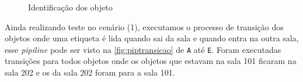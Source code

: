 \begin{figure}[ht]
        \centering\caption{Identificação dos objeto}
        \label{fig:piptransicao}
         \hspace{0.5cm}
             \hspace{0.5cm}
        \hspace{0.5cm}
             \hspace{0.5cm}
              \hspace{0.5cm}
\end{figure}

\par
Ainda realizando teste no cenário (1), executamos o processo de transição dos objetos onde uma etiqueta é lida quando sai da sala e quando entra na outra sala, esse \textit{pipiline} pode ser visto na \autoref{fig:piptransicao} de \texttt{A} até \texttt{E}. Foram executadas transições para todos objetos onde os objetos que estavam na sala 101 ficaram na sala 202 e os da sala 202 foram para a sala 101.

